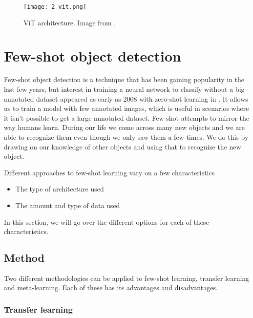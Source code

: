 \begin{figure}[H]
	\centering
	\texttt{[image: 2\_vit.png]}
	\caption{\label{fig:2_vit} ViT architecture. Image from \citet{vit}.}
\end{figure}

\section{Few-shot object detection}
Few-shot object detection is a technique that has been gaining popularity in the last few years, but interest in training a neural network to classify without a big annotated dataset appeared as early as 2008 with zero-shot learning in \citet{aaai08-132}. It allows us to train a model with few annotated images, which is useful in scenarios where it isn't possible to get a large annotated dataset. Few-shot attempts to mirror the way humans learn. During our life we come across many new objects and we are able to recognize them even though we only saw them a few times. We do this by drawing on our knowledge of other objects and using that to recognize the new object\cite{biederman1987recognition}. 

Different approaches to few-shot learning vary on a few characteristics
\begin{itemize}
	\item The type of architecture used
	\item The amount and type of data used
\end{itemize}

In this section, we will go over the different options for each of these characteristics.

\subsection{Method}

Two different methodologies can be applied to few-shot learning, transfer learning and meta-learning. Each of these has its advantages and disadvantages. %

\subsubsection*{Transfer learning}

